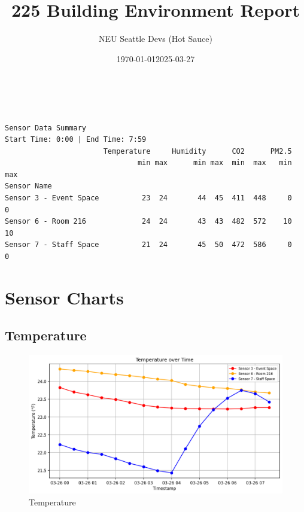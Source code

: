 \documentclass[
  12pt,
  letterpaper,
]{article}
\date{\today}
\title{225 Building Environment Report}
\author{NEU Seattle Devs (Hot Sauce)}
\date{2025-03-27}
\renewcommand*\contentsname{Table of contents}
\newcommand\contentsname{Table of contents}
\begin{document}
\maketitle

\renewcommand*\contentsname{Table of contents}
{
\hypersetup{linkcolor=}
\setcounter{tocdepth}{3}
\tableofcontents
}

\begin{verbatim}


Sensor Data Summary
Start Time: 0:00 | End Time: 7:59
                       Temperature     Humidity      CO2      PM2.5    
                               min max      min max  min  max   min max
Sensor Name                                                            
Sensor 3 - Event Space          23  24       44  45  411  448     0   0
Sensor 6 - Room 216             24  24       43  43  482  572    10  10
Sensor 7 - Staff Space          21  24       45  50  472  586     0   0
\end{verbatim}

\section{Sensor Charts}\label{sensor-charts}

\subsection{Temperature}\label{temperature}

\begin{figure}[H]

{\centering \includegraphics[width=0.85\linewidth,height=\textheight,keepaspectratio]{./charts/temperature_chart.png}

}

\caption{Temperature}

\end{figure}%
\end{document}
